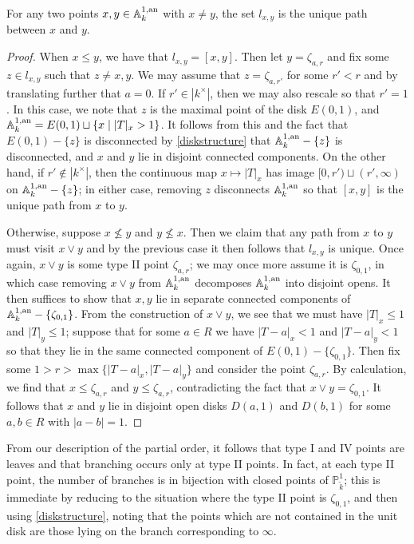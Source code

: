 \begin{prop}\parencite[Theorem 4.2.1]{berk1}
    For any two points $x, y \in \mathbb{A}^{1, \text{an}}_{k}$ with $x \neq y$, the set $l_{x, y}$ is the unique path between $x$ and $y$.
\end{prop}
\begin{proof}
When $x \leq y$, we have that $l_{x, y} = [x, y]$. Then let $y = \zeta_{a, r}$ and fix some $z \in l_{x, y}$ such that $z \neq x, y$. 
We may assume that $z = \zeta_{a, r'}$ for some $r' < r$ and by translating further that $a = 0$. 
If $r' \in |k^\times|$, then we may also rescale so that $r' = 1$. 
In this case, we note that $z$ is the maximal point of the disk $E(0, 1)$, and $\mathbb{A}^{1, \text{an}}_{k} = E(0, 1) \sqcup \{x \; | \; |T|_x > 1 \}$. 
It follows from this and the fact that $E(0,1) - \{  z \}$ is disconnected by \cref{diskstructure} that $\mathbb{A}^{1, \text{an}}_{k} - \{ z \}$ is disconnected, and $x$ and $y$ lie in disjoint connected components.
On the other hand, if $r' \not\in |k^\times|$, then the continuous map $x \mapsto |T|_x$ has image $[0, r') \sqcup (r', \infty)$ on $\mathbb{A}^{1, \text{an}}_{k} - \{z\}$; in either case, removing $z$ disconnects $\mathbb{A}^{1, \text{an}}_{k}$ so that $[x, y]$ is the unique path from $x$ to $y$.

Otherwise, suppose $x \not\leq y$ and $y \not\leq x$. Then we claim that any path from $x$ to $y$ must visit $x \lor y$ and by the previous case it then follows that $l_{x, y}$ is unique. 
Once again, $x \lor y$ is some type II point $\zeta_{a, r}$; we may once more assume it is $\zeta_{0, 1}$, in which case removing $x \lor y$ from $\mathbb{A}^{1, \text{an}}_{k}$ decomposes $\mathbb{A}^{1, \text{an}}_{k}$ into disjoint opens. 
It then suffices to show that $x, y$ lie in separate connected components of $\mathbb{A}^{1, \text{an}}_{k} - \{\zeta_{0, 1}\}$. 
From the construction of $x \lor y$, we see that we must have $|T|_x \leq 1$ and $|T|_y \leq 1$; suppose that for some $a \in R$ we have $|T - a|_x < 1$ and $|T - a|_y < 1$ so that they lie in the same connected component of $E(0, 1) - \{\zeta_{0, 1}\}$. Then fix some $1 > r > \max \{|T - a|_x, |T - a|_y \}$ and consider the point $\zeta_{a, r}$. By calculation, we find that $x \leq \zeta_{a, r}$ and $y \leq \zeta_{a, r}$, contradicting the fact that $x \lor y = \zeta_{0, 1}$.
It follows that $x$ and $y$ lie in disjoint open disks $D(a, 1)$ and $D(b, 1)$ for some $a, b \in R$ with $|a - b| = 1$.
\end{proof}

From our description of the partial order, it follows that type I and IV points are leaves and that branching occurs only at type II points. 
In fact, at each type II point, the number of branches is in bijection with closed points of $\mathbb{P}^{1}_{\tilde k}$; this is immediate by reducing to the situation where the type II point is $\zeta_{0, 1}$, and then using \cref{diskstructure}, noting that the points which are not contained in the unit disk are those lying on the branch corresponding to $\infty$.

